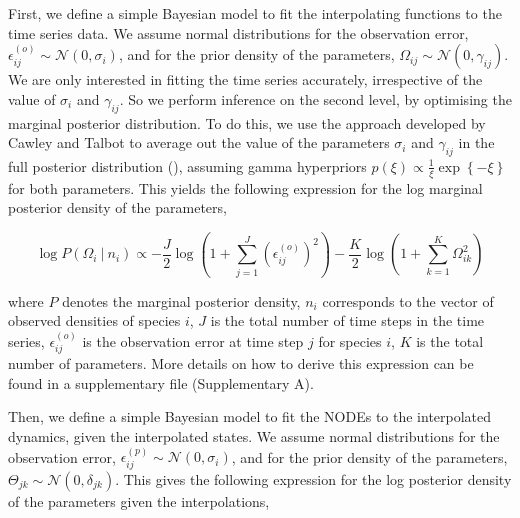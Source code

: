 \documentclass[11pt, oneside]{article}
\begin{document}
First, we define a simple Bayesian model to fit the interpolating functions to the time series data.
We assume normal distributions for the observation error, $\epsilon^{(o)}_{ij} \sim \mathcal{N}(0,\sigma_i)$, and for the prior density of the parameters, $\Omega_{ij} \sim \mathcal{N}(0,\gamma_{ij})$.
We are only interested in fitting the time series accurately, irrespective of the value of $\sigma_i$ and $\gamma_{ij}$.
So we perform inference on the second level, by optimising the marginal posterior distribution.
To do this, we use the approach developed by Cawley and Talbot to average out the value of the parameters $\sigma_i$ and $\gamma_{ij}$ in the full posterior distribution (\cite{Cawley2007}), assuming gamma hyperpriors $p(\xi) \propto \frac{1}{\xi} \exp\left\{- \xi \right\}$ for both parameters.
This yields the following expression for the log marginal posterior density of the parameters,

\vspace{-0.5cm}
\begin{equation}
    \log P(\Omega_i ~|~ n_i) \propto - \frac{J}{2} \log \left(1 + \sum_{j=1}^{J} \left( \epsilon^{(o)}_{ij} \right)^2 \right) - \frac{K}{2} \log \left(1 + \sum_{k=1}^{K} \Omega_{ik}^2 \right)
\end{equation}

where $P$ denotes the marginal posterior density,
$n_i$ corresponds to the vector of observed densities of species $i$, 
$J$ is the total number of time steps in the time series, 
$\epsilon^{(o)}_{ij}$ is the observation error at time step $j$ for species $i$, 
$K$ is the total number of parameters. 
More details on how to derive this expression can be found in a supplementary file (Supplementary A).


Then, we define a simple Bayesian model to fit the NODEs to the interpolated dynamics, given the interpolated states.
We assume normal distributions for the observation error, $\epsilon^{(p)}_{ij} \sim \mathcal{N}(0,\sigma_i)$, and for the prior density of the parameters, $\Theta_{jk} \sim \mathcal{N}(0,\delta_{jk})$.
This gives the following expression for the log posterior density of the parameters given the interpolations,
\end{document}

